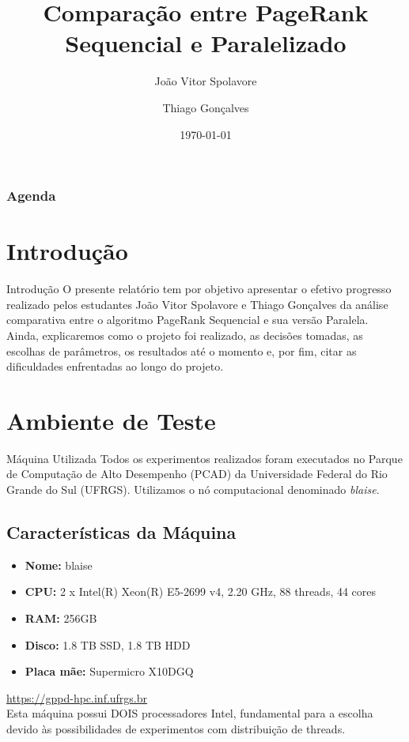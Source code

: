 \documentclass{beamer}
\title[Comparação PageRank]{Comparação entre PageRank Sequencial e Paralelizado}
\date{\today}
\author{João Vitor Spolavore \and Thiago Gonçalves}
\institute{Instituto de Informática --- UFRGS}
\begin{document}
\InfTitlePage

\begin{frame}
  \frametitle{Agenda}
  \tableofcontents
\end{frame}

\section{Introdução}
\begin{frame}{Introdução}
    O presente relatório tem por objetivo apresentar o efetivo progresso realizado pelos estudantes João Vitor Spolavore e Thiago Gonçalves da análise comparativa entre o algoritmo PageRank Sequencial e sua versão Paralela.\\
    \vspace{0.5em}
    Ainda, explicaremos como o projeto foi realizado, as decisões tomadas, as escolhas de parâmetros, os resultados até o momento e, por fim, citar as dificuldades enfrentadas ao longo do projeto.
\end{frame}

\section{Ambiente de Teste}
\begin{frame}{Máquina Utilizada}
    Todos os experimentos realizados foram executados no Parque de Computação de Alto Desempenho (PCAD) da Universidade Federal do Rio Grande do Sul (UFRGS).
    Utilizamos o nó computacional denominado \textit{blaise}.

    \subsection*{Características da Máquina}
    \begin{itemize}
        \item \textbf{Nome:} blaise
        \item \textbf{CPU:} 2 x Intel(R) Xeon(R) E5-2699 v4, 2.20 GHz, 88 threads, 44 cores
        \item \textbf{RAM:} 256GB 
        \item \textbf{Disco:} 1.8 TB SSD, 1.8 TB HDD
        \item \textbf{Placa mãe:} Supermicro X10DGQ
    \end{itemize}
    \url{https://gppd-hpc.inf.ufrgs.br}\\
    \vspace{0.6em}
    Esta máquina possui DOIS processadores Intel, fundamental para a escolha devido às possibilidades de experimentos com distribuição de threads.
\end{frame}
\end{document}

